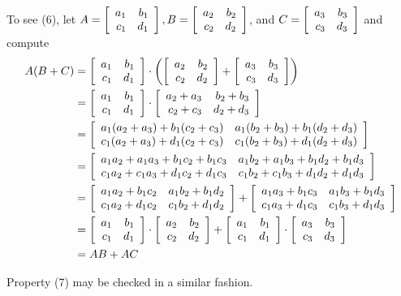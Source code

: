 \documentclass[11pt,fleqn,dvipsnames,usenames]{article}
\begin{document}
\begin{enumerate}[1.]
\begin{enumerate}[(a)]
\end{enumerate}

To see (6), let $A = \MATRIX{rr}{a_{1} & b_{1}\\c_{1} & d_{1}}, B = \MATRIX{rr}{a_{2} & b_{2}\\c_{2} & d_{2}}$, and $C = \MATRIX{rr}{a_{3} & b_{3}\\c_{3} & d_{3}}$ and compute
\begin{align*}
A(B+C) &= \MATRIX{rr}{a_{1} & b_{1}\\c_{1} & d_{1}} \cdot\left(\MATRIX{rr}{a_{2} & b_{2}\\c_{2} & d_{2}} + \MATRIX{rr}{a_{3} & b_{3}\\c_{3} & d_{3}}\right)\\
&= \MATRIX{rr}{a_{1} & b_{1}\\c_{1} & d_{1}} \cdot \MATRIX{rr}{a_{2} + a_{3} & b_{2} + b_{3}\\c_{2} + c_{3} & d_{2} + d_{3}}\\
&= \MATRIX{rr}{a_{1}(a_{2} + a_{3}) + b_{1}(c_{2} + c_{3}) & a_{1}(b_{2} + b_{3}) + b_{1}(d_{2} + d_{3})\\c_{1}(a_{2} + a_{3}) + d_{1}(c_{2} + c_{3}) & c_{1}(b_{2} + b_{3}) + d_{1}(d_{2} + d_{3})}\\
&= \MATRIX{rr}{a_{1}a_{2} + a_{1}a_{3} + b_{1}c_{2} + b_{1}c_{3} & a_{1}b_{2} + a_{1}b_{3} + b_{1}d_{2} + b_{1}d_{3}\\c_{1}a_{2} + c_{1}a_{3} + d_{1}c_{2} + d_{1}c_{3} & c_{1}b_{2} + c_{1}b_{3} + d_{1}d_{2} + d_{1}d_{3}}\\
&= \MATRIX{rr}{a_{1}a_{2} + b_{1}c_{2} & a_{1}b_{2} + b_{1}d_{2}\\c_{1}a_{2} + d_{1}c_{2} & c_{1}b_{2} + d_{1}d_{2}} + \MATRIX{rr}{a_{1}a_{3} +  b_{1}c_{3} & a_{1}b_{3} + b_{1}d_{3}\\c_{1}a_{3} + d_{1}c_{3} & c_{1}b_{3} + d_{1}d_{3}}\\
&= \MATRIX{rr}{a_{1} & b_{1}\\c_{1} & d_{1}}\cdot \MATRIX{rr}{a_{2} & b_{2}\\c_{2} & d_{2}} + \MATRIX{rr}{a_{1} & b_{1}\\c_{1} & d_{1}}\cdot \MATRIX{rr}{a_{3} & b_{3}\\c_{3} & d_{3}}\\
&= AB + AC
\end{align*}

Property (7) may be checked in a similar fashion.


\end{enumerate}
\end{document}
